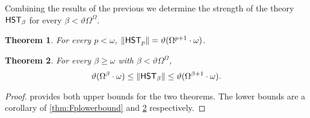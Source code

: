 \documentclass[UKenglish,cleveref,DIV=12]{scrartcl}
\newtheorem{theorem}{Theorem}[section]
\theoremstyle{definition}
\theoremstyle{definition}
\begin{document}
Combining the results of the previous  we determine
the strength of the theory $\mathsf{HST}_\beta$ for every $\beta<\vartheta\Omega^\Omega$.
%
\begin{theorem}\label{thm:Fpstrength}
 For every $p<\omega$,
 \(
  \lVert{\mathsf{HST}_p}\rVert=\vartheta(\Omega^{p+1}\cdot\omega)
 \).
\end{theorem}
%
\begin{theorem}\label{thm:Fbetastrength}
 For every $\beta\ge\omega$ with $\beta<\vartheta\Omega^\Omega$,
 \[
  \vartheta(\Omega^\beta\cdot\omega)\le\lVert{\mathsf{HST}_\beta}\rVert\le\vartheta(\Omega^{\beta+1}\cdot\omega).
 \]
\end{theorem}
%
\begin{proof} 
 provides both upper bounds for the two
theorems. 
The lower bounds are a corollary of
\cref{thm:Fplowerbound} and
\cref{thm:Fbetastrength} respectively.
\end{proof}
%
\end{document}
